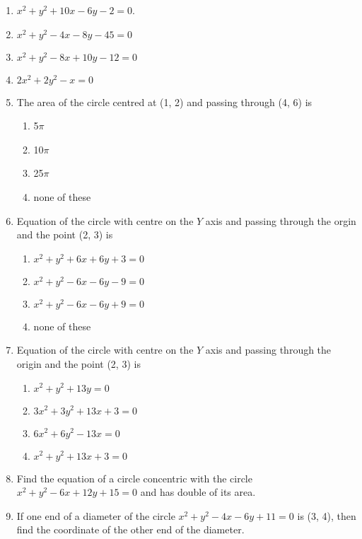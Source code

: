 \begin{enumerate}[label=\thesubsection.\arabic*, ref=\thesubsection.\theenumi, resume*]
\item  $x^2+y^2 +10x -6y -2=0$. 
	 \\
		\solution
\label{chapters/11/11/1/6}

\item  $x^{2}+y^{2}-4 x-8 y-45=0$
	 \\
		\solution
\label{chapters/11/11/1/7}

\item  $x^{2}+y^{2}-8 x+10 y-12=0$ 
	 \\
		\solution
\label{chapters/11/11/1/8}

\item  $2 x^{2}+2 y^{2}-x=0$
	 \\
		\solution
\label{chapters/11/11/1/9}

\item The area of the circle centred at (1, 2) and passing through (4, 6) is
\begin{enumerate}
\item 5$\pi$ 
\item 10$\pi$
 \item 25$\pi$ 
\item none of these
\end{enumerate}
\item Equation of the circle with centre on the $Y$ axis and passing through the orgin and the point (2, 3) is
\begin{enumerate}
\item $x^2+y^2+6x+6y+3=0$ 
\item $x^2+y^2-6x-6y-9=0$
\item $x^2+y^2-6x-6y+9=0$
\item none of these
\end{enumerate}
\item Equation of the circle with centre on the  $Y$ axis and passing through the origin and the point (2, 3) is  
\begin{enumerate}
\item $x^2+y^2+13y=0$
\item $3x^2+3y^2+13x+3=0$
\item $6x^2+6y^2-13x=0$
\item $x^2+y^2+13x+3=0$
\end{enumerate}
 \item Find the equation of a circle concentric with the circle $x^2+y^2-6x+12y+15=0$ and has double of its area.
 \item If one end of a diameter of the circle $x^2+y^2-4x-6y+11 =0$ is (3, 4),  then find the coordinate of the other end of the diameter.

\end{enumerate}
